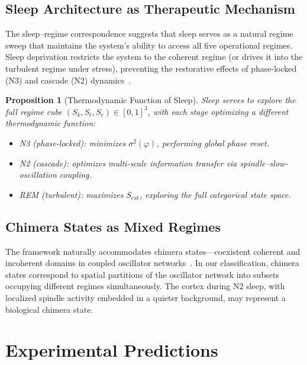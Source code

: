 \documentclass[aps,prd,twocolumn,superscriptaddress,floatfix,nofootinbib]{revtex4-2}
\newtheorem{proposition}[theorem]{Proposition}
\theoremstyle{remark}
\newcommand{\Sk}{S_k}
\newcommand{\St}{S_t}
\newcommand{\Se}{S_e}
\newcommand{\Scat}{S_{\mathrm{cat}}}
\begin{document}
\subsection{Sleep Architecture as Therapeutic Mechanism}

The sleep--regime correspondence suggests that sleep serves as a natural regime sweep that maintains the system's ability to access all five operational regimes. Sleep deprivation restricts the system to the coherent regime (or drives it into the turbulent regime under stress), preventing the restorative effects of phase-locked (N3) and cascade (N2) dynamics~\cite{diekelmann2010memory}.

\begin{proposition}[Thermodynamic Function of Sleep]
Sleep serves to explore the full regime cube $(\Sk, \St, \Se) \in [0,1]^3$, with each stage optimizing a different thermodynamic function:
\begin{itemize}
    \item N3 (phase-locked): minimizes $\sigma^2(\varphi)$, performing global phase reset.
    \item N2 (cascade): optimizes multi-scale information transfer via spindle--slow-oscillation coupling.
    \item REM (turbulent): maximizes $\Scat$, exploring the full categorical state space.
\end{itemize}
\end{proposition}

\subsection{Chimera States as Mixed Regimes}

The framework naturally accommodates chimera states---coexistent coherent and incoherent domains in coupled oscillator networks~\cite{panaggio2015chimera,abrams2004chimera}. In our classification, chimera states correspond to spatial partitions of the oscillator network into subsets occupying different regimes simultaneously. The cortex during N2 sleep, with localized spindle activity embedded in a quieter background, may represent a biological chimera state.

\section{Experimental Predictions}
\label{sec:predictions}
\end{document}
